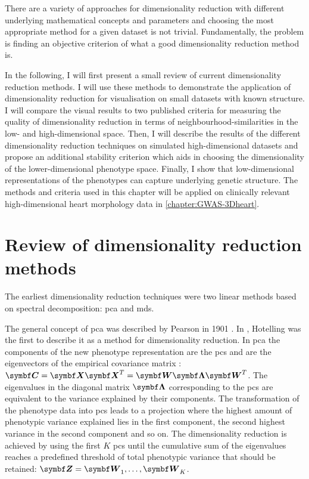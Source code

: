 There are a variety of approaches for dimensionality reduction with different underlying mathematical concepts and parameters and choosing the most appropriate method for a given dataset is not trivial. Fundamentally, the problem is finding an objective criterion of what a good dimensionality reduction method is. 

In the following, I will first present a small review of current dimensionality reduction methods. I will use these methods to demonstrate the application of dimensionality reduction for visualisation on small datasets with known structure. I will compare the visual results to two published criteria for measuring the quality of dimensionality reduction in terms of neighbourhood-similarities in the low- and high-dimensional space. Then, I will describe the results of the different dimensionality reduction techniques on simulated high-dimensional datasets and propose an additional stability criterion which aids in choosing the dimensionality of the lower-dimensional phenotype space. Finally, I show that low-dimensional representations of the phenotypes can capture underlying genetic structure. The methods and criteria used in this chapter will be applied on clinically relevant high-dimensional heart morphology data in \cref{chapter:GWAS-3Dheart}.

\section{Review of dimensionality reduction methods}
\label{section:DimReduction-methods}
The earliest dimensionality reduction techniques were two linear methods based on spectral decomposition: \gls{pca} and \gls{mds}. 

The general concept of \gls{pca} was described by Pearson in 1901 \citep{Pearson1901}. In  \parencite*{Hotelling1933}, Hotelling was the first to describe it as a method for dimensionality reduction. In \gls{pca} the components of the new phenotype representation are the \glspl{pc} and are the eigenvectors  of the empirical covariance matrix :  \(\mat{C}=\mat{X}\mat{X}^T = \mat{W}\mat{\Lambda}\mat{W}^T\). The eigenvalues in the diagonal matrix \(\mat{\Lambda}\) corresponding to the \glspl{pc} are equivalent to the variance explained by their components. The transformation of the phenotype data into \glspl{pc} leads to a projection where the highest amount of phenotypic variance explained lies in the first component, the second highest variance in the second component and so on. The dimensionality reduction is achieved by using the first \(K\) \glspl{pc} until the cumulative sum of the eigenvalues reaches a predefined threshold of total phenotypic variance that should be retained: \(\mat{Z}={\matsub{W}{1}, \dots, \matsub{W}{K}}\). 
 

